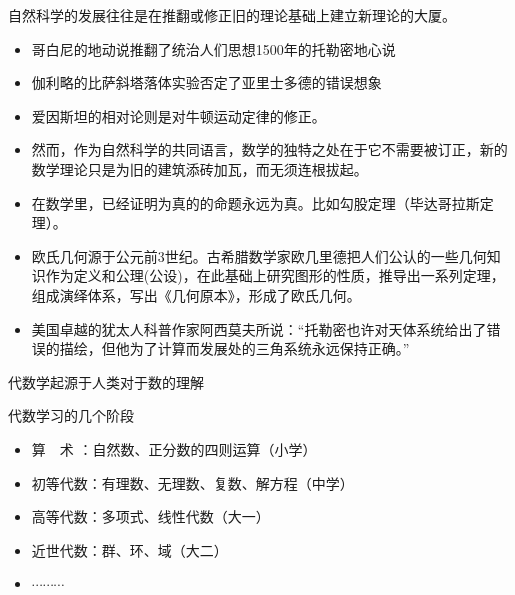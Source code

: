 \documentclass[13pt,fontset=mac]{ctexbeamer}
\begin{document}
\begin{frame}
	自然科学的发展往往是在推翻或修正旧的理论基础上建立新理论的大厦。
	\begin{itemize}
		\item 哥白尼的地动说推翻了统治人们思想1500年的托勒密地心说
		\item 伽利略的比萨斜塔落体实验否定了亚里士多德的错误想象
		\item 爱因斯坦的相对论则是对牛顿运动定律的修正。
	\end{itemize}
\end{frame}



		\begin{frame}
	\begin{itemize}
		\item 然而，作为自然科学的共同语言，数学的独特之处在于它不需要被订正，新的数学理论只是为旧的建筑添砖加瓦，而无须连根拔起。
		\item 在数学里，已经证明为真的的命题永远为真。比如勾股定理（毕达哥拉斯定理）。
		\item 欧氏几何源于公元前3世纪。古希腊数学家欧几里德把人们公认的一些几何知识作为定义和公理(公设)，在此基础上研究图形的性质，推导出一系列定理，组成演绎体系，写出《几何原本》，形成了欧氏几何。
		\item 美国卓越的犹太人科普作家阿西莫夫所说：“托勒密也许对天体系统给出了错误的描绘，但他为了计算而发展处的三角系统永远保持正确。”
	\end{itemize}
\end{frame}

\begin{frame}
	代数学起源于人类对于数的理解
	
	\vspace{6pt}
	
	代数学习的几个阶段
	\begin{itemize}
		\item 算~~术 ：自然数、正分数的四则运算（小学）
		\item 初等代数：有理数、无理数、复数、解方程（中学）
		\item 高等代数：多项式、线性代数（大一）
		\item 近世代数：群、环、域（大二）
		\item $\cdots \cdots\cdots$
	\end{itemize}
\end{frame}
\end{document}
